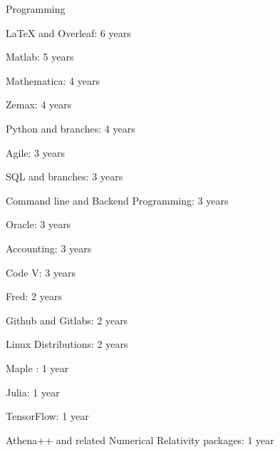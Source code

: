 \begin{cventries}
  \cventry
    {}
    {Programming}
    {}
    {}
    {
      \begin{cvitems}
        \item {LaTeX and Overleaf: 6 years}
        \item {Matlab: 5 years }
        \item {Mathematica: 4 years }
        \item {Zemax: 4 years}
        \item {Python and branches: 4 years }
        \item {Agile: 3 years}
        \item {SQL and branches: 3 years }
        \item{Command line and Backend Programming: 3 years}
        \item {Oracle: 3 years}
        \item{Accounting: 3 years}
        \item {Code V: 3 years}
        \item {Fred: 2 years}
        \item{Github and Gitlabs: 2 years}
        \item {Linux Distributions: 2 years}
        \item {Maple : 1 year}
        \item{Julia: 1 year}
        \item{TensorFlow: 1 year}
        \item{Athena++ and related Numerical Relativity packages: 1 year}
      \end{cvitems}
    }


\end{cventries}
